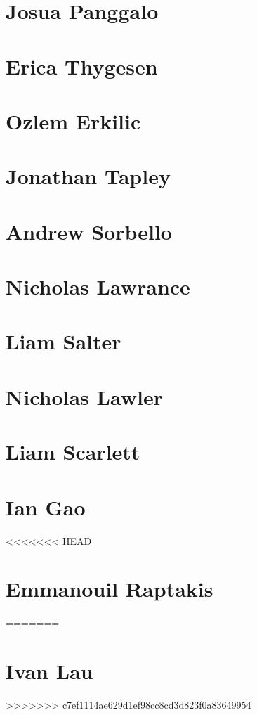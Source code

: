 \chapter{Josua Panggalo}



\chapter{Erica Thygesen}



\chapter{Ozlem Erkilic}


\chapter{Jonathan Tapley}

\chapter{Andrew Sorbello}

\chapter{Nicholas Lawrance}


\chapter{Liam Salter}


\chapter{Nicholas Lawler}


\chapter{Liam Scarlett}


\chapter{Ian Gao}


<<<<<<< HEAD
\chapter{Emmanouil Raptakis}

=======
\chapter{Ivan Lau}


>>>>>>> c7ef1114ae629d1ef98cc8cd3d823f0a83649954



